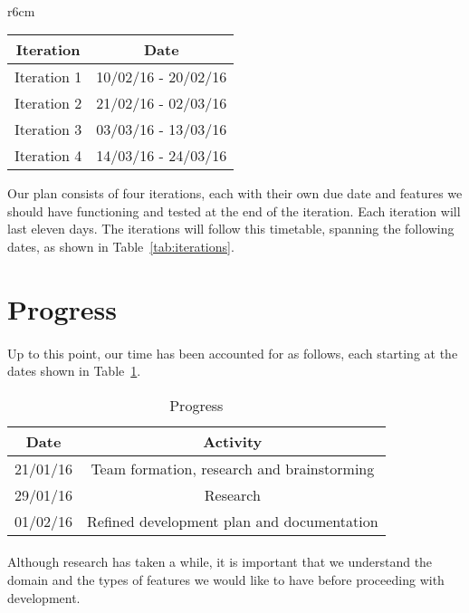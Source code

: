 \documentclass[11pt, a4paper]{article}
\begin{document}
\paragraph{}
\begin{wraptable}{r}{6cm}
\centering
 \begin{tabular}{|c|c|}
  \hline
  \textbf{Iteration} & \textbf{Date}  \\ \hline
  Iteration 1 & 10/02/16 - 20/02/16 \\ \hline
  Iteration 2 & 21/02/16 - 02/03/16 \\ \hline
  Iteration 3 & 03/03/16 - 13/03/16 \\ \hline
  Iteration 4 & 14/03/16 - 24/03/16 \\ \hline
 \end{tabular}
\caption{Iteration Cycles}
\label{tab:iterations}
\end{wraptable}
Our plan consists of four iterations, each with their own due date and features we should have functioning and tested at the end of the iteration. Each iteration will last eleven days. The iterations will follow this timetable, spanning the following dates, as shown in Table~\ref{tab:iterations}.

\section{Progress}\label{prog}
\paragraph{}
Up to this point, our time has been accounted for as follows, each starting at the dates shown in Table~\ref{tab:progress}.
\begin{table}[!htbp]
\centering
 \begin{tabular}{|c|c|}
  \hline
  \textbf{Date} & \textbf{Activity}  \\ \hline
  21/01/16 & Team formation, research and brainstorming \\ \hline
  29/01/16 & Research \\ \hline
  01/02/16 & Refined development plan and documentation \\ \hline
 \end{tabular}
\caption{Progress}
\label{tab:progress}
\end{table}
\paragraph{}
Although research has taken a while, it is important that we understand the domain and the types of features we would like to have before proceeding with development.
\end{document}
